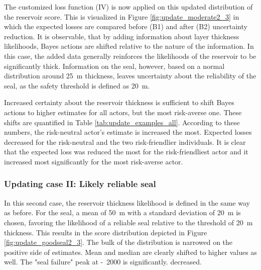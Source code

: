 				The customized loss function (IV) is now applied on this updated distribution of the reservoir score. This is visualized in Figure \ref{fig:update_moderate2_3} in which the expected losses are compared before (B1) and after (B2) uncertainty reduction. It is observable, that by adding information about layer thickness likelihoods, Bayes actions are shifted relative to the nature of the information. In this case, the added data generally reinforces the likelihoods of the reservoir to be significantly thick. Information on the seal, however, based on a normal distribution around 25~m thickness, leaves uncertainty about the reliability of the seal, as the safety threshold is defined as 20~m. 
				
				Increased certainty about the reservoir thickness is sufficient to shift Bayes actions to higher estimates for all actors, but the most risk-averse one. These shifts are quantified in Table \ref{tab:update_examples_all}. According to these numbers, the risk-neutral actor's estimate is increased the most. Expected losses decreased for the risk-neutral and the two risk-friendlier individuals. It is clear that the expected loss was reduced the most for the risk-friendliest actor and it increased most significantly for the most risk-averse actor.
								
				\subsubsection{Updating case II: Likely reliable seal}
				In this second case, the reservoir thickness likelihood is defined in the same way as before. For the seal, a mean of 50~m with a standard deviation of 20~m is chosen, favoring the likelihood of a reliable seal relative to the threshold of 20~m thickness. This results in the score distribution depicted in Figure \ref{fig:update_goodseal2_3}. The bulk of the distribution is narrowed on the positive side of estimates. Mean and median are clearly shifted to higher values as well. The "seal failure" peak at -~2000 is significantly. decreased.
				
